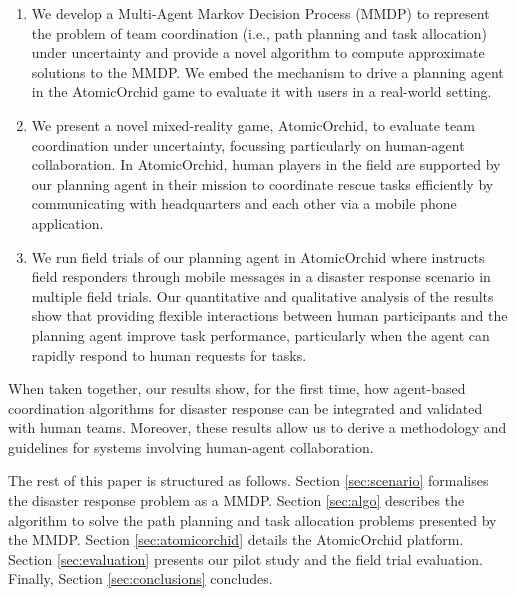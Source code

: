 \begin{enumerate}
\item We develop a Multi-Agent Markov Decision Process (MMDP) to represent the problem of  team coordination  (i.e., path planning and task allocation) under uncertainty \cite{boutilier1996planning} and provide a novel algorithm to compute approximate solutions to the MMDP.  We embed the mechanism to drive a planning  agent in the AtomicOrchid game to evaluate it with users in a real-world setting. 
\item We present a novel mixed-reality game, AtomicOrchid, to evaluate team coordination under uncertainty, focussing particularly on human-agent collaboration. In AtomicOrchid, human players in the field are supported by our planning agent in their mission to coordinate rescue tasks efficiently by communicating with headquarters and each other via a mobile phone application.
\item We run field trials of our planning  agent in AtomicOrchid where  instructs field responders through mobile messages in a disaster response scenario in multiple field trials. Our quantitative and qualitative analysis of the results show that providing flexible interactions between human participants and the planning agent improve task performance, particularly when the agent can rapidly respond to human requests for tasks. 
\end{enumerate}
When taken together, our results show, for the first time, how agent-based coordination algorithms for disaster response can be integrated and validated with human teams. Moreover, these results allow us to derive a methodology and guidelines  for systems involving  human-agent collaboration. 

The rest of this paper is structured as follows. Section \ref{sec:scenario} formalises the disaster response problem as a MMDP. Section \ref{sec:algo}  describes the algorithm to solve the path planning and task allocation problems presented by the MMDP. Section \ref{sec:atomicorchid}  details the AtomicOrchid platform. Section \ref{sec:evaluation} presents our pilot study and the  field trial evaluation.  Finally, Section \ref{sec:conclusions} concludes.